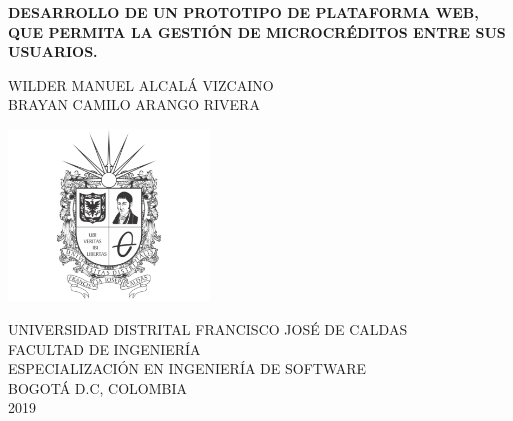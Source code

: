 \begin{titlepage}
	\begin{center}
	\textbf{DESARROLLO DE UN PROTOTIPO DE PLATAFORMA WEB, QUE PERMITA LA GESTIÓN DE MICROCRÉDITOS ENTRE SUS USUARIOS.}\\
	\vspace{5cm}
	
	{WILDER MANUEL ALCALÁ VIZCAINO}\\
	{BRAYAN CAMILO ARANGO RIVERA}\\ 
	\vspace{4cm}
	
	\includegraphics[width=0.4\textwidth]{start/Universidad}\\
	\vspace{0.5cm}
	
	{UNIVERSIDAD DISTRITAL FRANCISCO JOSÉ DE CALDAS}\\
	{FACULTAD DE INGENIERÍA}\\
	{ESPECIALIZACIÓN EN INGENIERÍA DE SOFTWARE}\\
	{BOGOTÁ D.C, COLOMBIA}\\
	{2019}\\
	\end{center}
\end{titlepage}